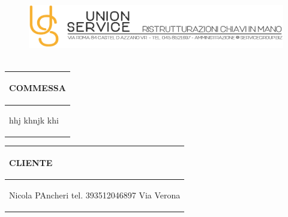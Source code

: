 \documentclass[a4paper]{article}
\begin{document}
                        
                        \begin{figure}[!t]
                        \includegraphics[width=15.8cm, height=3cm]{intestazioneAlta2.jpg}
                        \end{figure}
                        
                        \noindent\begin{tabular}{| L{72.2mm} |}
                            \hline
                            \vspace{2.5mm}
                            \begin{spacing}{0}
                            \textbf{COMMESSA}
                            \end{spacing}\\
                            \hline
                            \vspace{4mm}
                            \begin{spacing}{1.2}

                        hhj \newline khnjk \newline khi
                          \end{spacing}\\
                            \hline
                          \end{tabular}
                          \quad
                          \begin{tabular}{ | R{72.2mm} | }
                            \hline
                            \vspace{2.5mm}
                            \begin{spacing}{0}
                            \textbf{CLIENTE}
                            \end{spacing}\\
                            \hline
                            \vspace{4mm}
                            \begin{spacing}{1.2}
                        
                       Nicola PAncheri \newline tel. 393512046897 \newline Via Verona
                          \end{spacing}\\
                            \hline
                          \end{tabular}
                        
\end{document}
